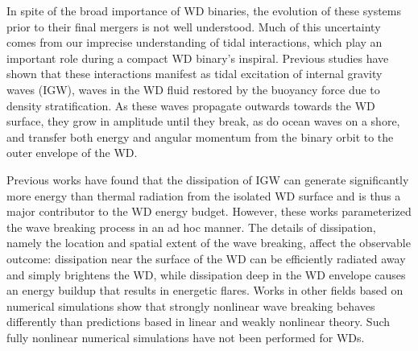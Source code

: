 \documentclass[twocolumn,
        nofootinbib, %
        usenames, %
        aps,
        prd,
        dvipsnames %
    ]{revtex4-1}%
\begin{document}
In spite of the broad importance of WD binaries, the evolution of these systems
prior to their final mergers is not well understood. Much of this uncertainty
comes from our imprecise understanding of tidal interactions, which play an
important role during a compact WD binary's inspiral\cite{fullerII}. Previous
studies have shown that these interactions manifest as tidal excitation of
internal gravity waves (IGW), waves in the WD fluid restored by the buoyancy
force due to density stratification\cite{fullerI}. As these waves propagate
outwards towards the WD surface, they grow in amplitude until they break, as do
ocean waves on a shore, and transfer both energy and angular momentum from the
binary orbit to the outer envelope of the WD\cite{fullerI,fullerII}.

Previous works have found that the dissipation of IGW can generate significantly
more energy than thermal radiation from the isolated WD surface and is thus a
major contributor to the WD energy budget\cite{fullerII,fullerIV}. However,
these works parameterized the wave breaking process in an ad hoc manner. The
details of dissipation, namely the location and spatial extent of the wave
breaking, affect the observable outcome: dissipation near the surface of the WD
can be efficiently radiated away and simply brightens the WD, while dissipation
deep in the WD envelope causes an energy buildup that results in energetic
flares\cite{tidal_novae}. Works in other fields based on numerical simulations
show that strongly nonlinear wave breaking behaves differently than predictions
based in linear and weakly nonlinear theory\cite{winters1994,barker_ogilvie}.
Such fully nonlinear numerical simulations have not been performed for WDs.



\end{document}
